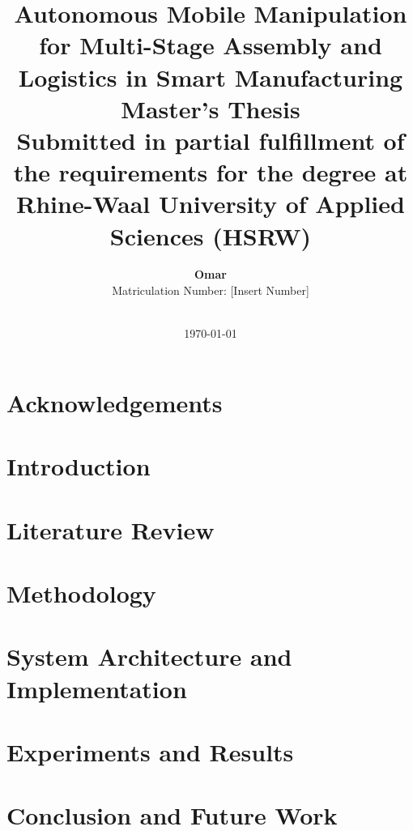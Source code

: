 \documentclass[12pt, a4paper, twoside]{report}
\title{
    \vspace*{2cm}
    \textbf{\Large Autonomous Mobile Manipulation for Multi-Stage Assembly and Logistics in Smart Manufacturing} \\
    \vspace{1.5cm}
    \large Master's Thesis \\
    \vspace{1cm}
    \normalsize Submitted in partial fulfillment of the requirements for the degree at \\
    Rhine-Waal University of Applied Sciences (HSRW)
}
\author{
    \textbf{Omar} \\ 
    \normalsize Matriculation Number: [Insert Number] \\ \\
}
\date{\vfill \today}
\begin{document}
\maketitle


\begin{abstract}

\end{abstract}

\chapter*{Acknowledgements}


\tableofcontents
\listoffigures
\listoftables
\clearpage


\chapter{Introduction}


\chapter{Literature Review}


\chapter{Methodology}


\chapter{System Architecture and Implementation}


\chapter{Experiments and Results}


\chapter{Conclusion and Future Work}

\end{document}
